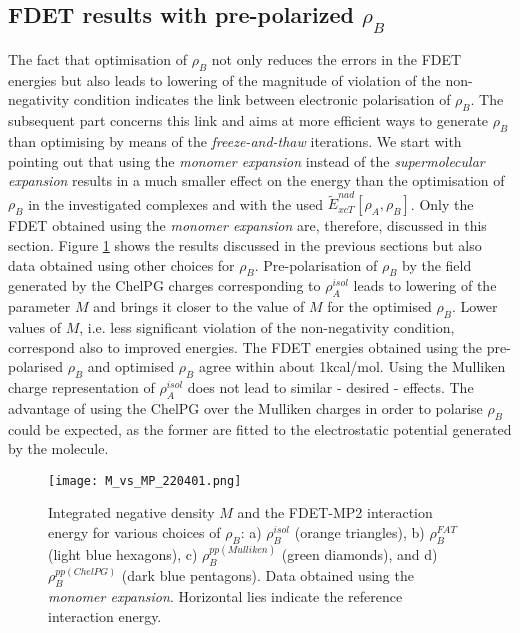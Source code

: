\documentclass[journal=jctcce,manuscript=article]{achemso}
\newcommand{\nr}[1]{\color{red}#1\color{black}}
\begin{document}
\subsection{FDET results with pre-polarized  $\rho_B$}

The fact that optimisation of $\rho_B$ not only reduces the errors in the FDET energies but also leads to lowering of the magnitude of violation of the non-negativity condition indicates the link between electronic polarisation of 
$\rho_B$. 
The subsequent part concerns this link and aims at more efficient ways to generate $\rho_B$ than optimising by means of the  {\it freeze-and-thaw} iterations.  
We start with pointing out that using the  {\it monomer expansion} instead of the {\it supermolecular expansion} results in a much smaller effect on the energy than the optimisation of $\rho_B$ in the investigated complexes and with the used $\tilde{E}_{xcT}^{nad}[\rho_A,\rho_B]$. 
Only the  FDET  obtained using the {\it monomer expansion} are, therefore, discussed in this section.
Figure \ref{fig:M_vs_MP} 
shows the results discussed in the previous sections but also data obtained using other choices  for $\rho_B$.
Pre-polarisation of $\rho_B$ by the field generated by the ChelPG charges corresponding to $\rho_A^{isol}$ leads to lowering of the parameter $M$ and brings it closer to the value of $M$ for the optimised $\rho_B$. 
Lower values of $M$, i.e. less significant violation of the non-negativity condition, correspond also to improved energies. 
The FDET energies obtained using the pre-polarised $\rho_B$ and optimised $\rho_B$ agree within about 1kcal/mol.
Using the  Mulliken charge representation of $\rho_A^{isol}$ does not lead to similar - desired - effects. 
The advantage of using the ChelPG  over the Mulliken charges  in order to polarise $\rho_B$ could be expected\nr{, as the former } are fitted to the electrostatic potential generated by the molecule.
\begin{figure}[H]
\centering
\texttt{[image: M\_vs\_MP\_220401.png]}
\caption{Integrated negative density $M$ and the FDET-MP2 interaction energy for various choices of $\rho_B$:  a) $\rho_B^{isol}$ (orange triangles), b) $\rho_B^{FAT}$ (light blue hexagons), c) $\rho_B^{pp(Mulliken)}$ (green diamonds), and d) $\rho_B^{pp(ChelPG)}$ (dark blue pentagons). Data obtained using the {\it monomer expansion}. Horizontal lies indicate the reference interaction energy.}
\label{fig:M_vs_MP}
\end{figure}
\end{document}
